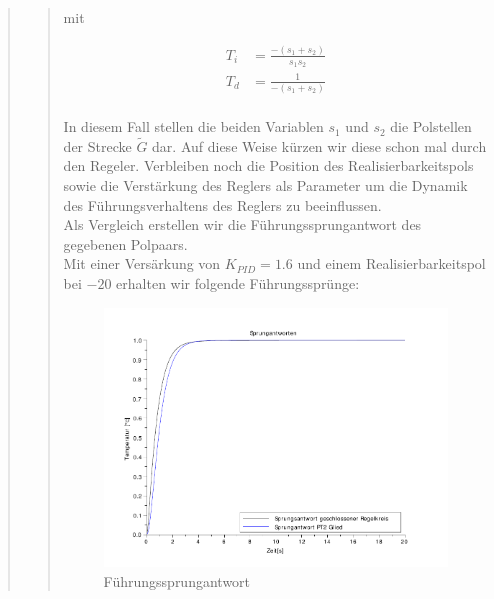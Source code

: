 \begin{quote}
\begin{quote}
        mit 
        
        \begin{equation*}
        	\begin{split}
        		T_i &= \frac{-(s_1 + s_2)}{s_1 s_2}\\
        		T_d &= \frac{1}{-(s_1 + s_2)}\\
        	\end{split}
        \end{equation*}
        
        In diesem Fall stellen die beiden Variablen $s_1$ und $s_2$ die Polstellen der Strecke $\tilde{G}$ dar. Auf
        diese Weise kürzen wir diese schon mal durch den Regeler. Verbleiben noch die Position des Realisierbarkeitspols
        sowie die Verstärkung des Reglers als Parameter um die Dynamik des Führungsverhaltens des Reglers zu
        beeinflussen.\\
        
        Als Vergleich erstellen wir die Führungssprungantwort des gegebenen Polpaars.\\
        
        Mit einer Versärkung von $K_{PID} = 1.6$ und einem Realisierbarkeitspol bei $-20$ erhalten wir folgende
        Führungssprünge:
        
        \begin{figure}[H]
        \centering
            \includegraphics[scale=0.7, trim = 0cm 0cm 0cm 0cm, clip]{./Bilder/Sprungantwort}
                \caption{Führungssprungantwort}
        \end{figure}
    

\end{quote}
\end{quote}
